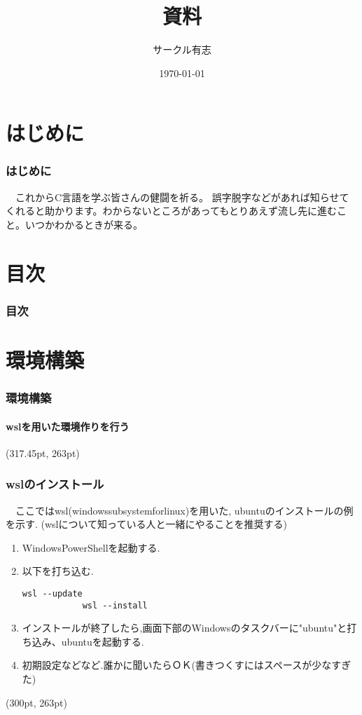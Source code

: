 \documentclass[dvipdfmx]{beamer}
\title{資料}
\author{サークル有志}
\date{\today}
\begin{document}
\begin{frame}[plain]
    \frametitle{}
    \titlepage
\end{frame}

\section{はじめに}
\begin{frame}[c]
    \frametitle{はじめに}
    　これから\textrm{C}言語を学ぶ皆さんの健闘を祈る。
    誤字脱字などがあれば知らせてくれると助かります。わからないところがあってもとりあえず流し先に進むこと。いつかわかるときが来る。
\end{frame}

\section{目次}
\begin{frame}[allowframebreaks]
    \frametitle{目次}
    \tableofcontents
\end{frame}

\section{環境構築}
\begin{frame}[t, fragile]
    \frametitle{環境構築}
    \framesubtitle{wslを用いた環境作りを行う}
    \tableofcontents[sections={2,3}]
    \begin{textblock*}{0.3\linewidth}(317.45pt, 263pt)
    \end{textblock*}
\end{frame}

\begin{frame}[t, fragile]
    \frametitle{wslのインストール}
    　ここではwsl(windows\space subsystem\space for\space linux)を用いた,
    ubuntuのインストールの例を示す.
    (wslについて知っている人と一緒にやることを推奨する)
    \begin{enumerate}
        \item Windows\space PowerShellを起動する.
        \item 以下を打ち込む.
        \begin{lstlisting}[gobble=9, caption=Windows\space PowerShell]
            wsl --update
            wsl --install
        \end{lstlisting}
        \item インストールが終了したら,画面下部のWindowsのタスクバーに"ubuntu"と打ち込み、ubuntuを起動する.
        \item 初期設定などなど.誰かに聞いたらＯＫ(書きつくすにはスペースが少なすぎた)
    \end{enumerate}
    \begin{textblock*}{0.3\linewidth}(300pt, 263pt)
        \space
    \end{textblock*}
\end{frame}
\end{document}
